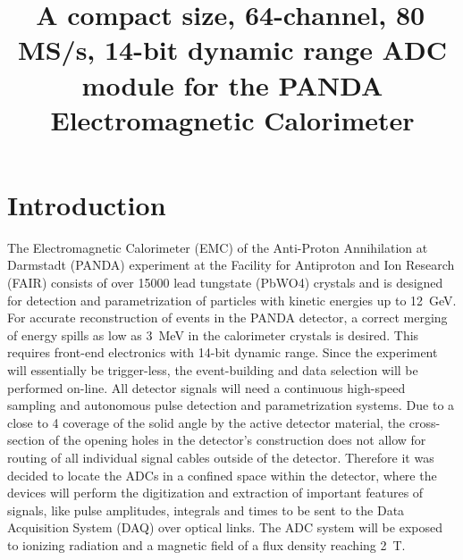 \documentclass[12pt,a4paper, twocolumn]{article}
\title{A compact size, 64-channel, 80\,MS/s, 14-bit dynamic range ADC module for the PANDA Electromagnetic Calorimeter}
\begin{document}
\onecolumn
\date{}
\maketitle
\thispagestyle{empty}
\newpage

\thispagestyle{empty}
\twocolumn
{}
\setcounter{page}{1}
\runningpagewiselinenumbers
\modulolinenumbers[5]

\linenumbers
\section{Introduction}
The Electromagnetic Calorimeter (EMC) of the Anti-Proton Annihilation at Darmstadt (PANDA) experiment at the Facility for Antiproton and Ion Research (FAIR) consists of over 15000 lead tungstate (PbWO4) crystals and is designed for detection and parametrization of particles with kinetic energies up to \SI{12}{\giga\electronvolt}. For accurate reconstruction of events in the PANDA detector, a correct merging of energy spills as low as \SI{3}{\mega\electronvolt} in the calorimeter crystals is desired. This requires front-end electronics with 14-bit dynamic range.
Since the experiment will essentially be trigger-less, the event-building and data selection will be performed on-line.  All detector signals will need a continuous high-speed sampling and autonomous pulse detection and parametrization systems.  Due to a close to \SI{4}{\pi} coverage of the solid angle by the active detector material, the cross-section of the opening holes in the detector’s construction does not allow for routing of all individual signal cables outside of the detector. Therefore it was decided to locate the ADCs in a confined space within the detector, where the devices will perform the digitization and extraction of important features of signals, like pulse amplitudes, integrals and times to be sent to the Data Acquisition System (DAQ) over optical links. The ADC system will be exposed to ionizing radiation and a magnetic field of a flux density reaching \SI{2}{\tesla}. 
\end{document}
